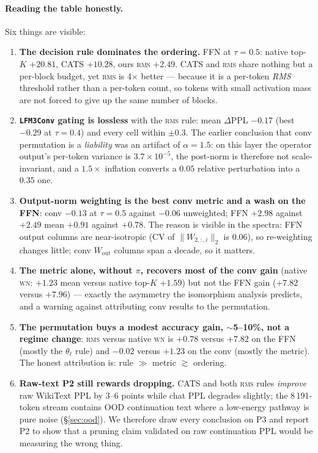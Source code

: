 \documentclass[11pt]{article}
\newcommand{\Wout}{\ensuremath{W_{\mathrm{out}}}}
\newcommand{\thetal}{\theta_\ell}
\newcommand{\code}[1]{\texttt{\small #1}}
\newcommand{\rms}{\textsc{rms}}
\newcommand{\wn}{\textsc{wn}}
\begin{document}
\paragraph{Reading the table honestly.} Six things are visible:
\begin{enumerate}
\item \textbf{The decision rule dominates the ordering.} FFN at $\tau{=}0.5$: native
top-$K$ $+20.81$, CATS $+10.28$, ours \rms{} $+2.49$. CATS and \rms{} share nothing but a
per-block budget, yet \rms{} is 4$\times$ better --- because it is a per-token \emph{RMS}
threshold rather than a per-token count, so tokens with small activation mass are not
forced to give up the same number of blocks.
\item \textbf{\code{LFM3Conv} gating is lossless} with the \rms{} rule: mean
$\Delta$PPL $-0.17$ (best $-0.29$ at $\tau{=}0.4$) and every cell within
$\pm0.3$. The earlier conclusion that conv permutation is a \emph{liability} was an
artifact of $\alpha{=}1.5$: on this layer the operator output's per-token variance is
$3.7\times10^{-5}$, the post-norm is therefore not scale-invariant, and a $1.5\times$
inflation converts a $0.05$ relative perturbation into a $0.35$ one.
\item \textbf{Output-norm weighting is the best conv metric and a wash on the FFN}: conv
$-0.13$ at $\tau{=}0.5$ against $-0.06$ unweighted; FFN $+2.98$ against $+2.49$ mean
$+0.91$ against $+0.78$. The reason is visible in the spectra: FFN output columns are
near-isotropic ($\mathrm{CV}$ of $\|W_{2,:,i}\|_2$ is 0.06), so re-weighting changes
little; conv \Wout{} columns span a decade, so it matters.
\item \textbf{The metric alone, without $\pi$, recovers most of the conv gain}
(native \wn: $+1.23$ mean versus native top-$K$ $+1.59$) but not the FFN gain
($+7.82$ versus $+7.96$) --- exactly the asymmetry the isomorphism analysis predicts, and
a warning against attributing conv results to the permutation.
\item \textbf{The permutation buys a modest accuracy gain, $\sim$5--10\%, not a
regime change}: \rms{} versus native \wn{} is $+0.78$ versus $+7.82$ on the FFN
(mostly the $\thetal$ rule) and $-0.02$ versus $+1.23$ on the conv (mostly the metric).
The honest attribution is: rule $\gg$ metric $\gtrsim$ ordering.
\item \textbf{Raw-text P2 still rewards dropping.} CATS and both \rms{} rules \emph{improve}
raw WikiText PPL by 3--6 points while chat PPL degrades slightly; the 8\,191-token stream
contains OOD continuation text where a low-energy pathway is pure noise
(\S\ref{sec:ood}). We therefore draw every conclusion on P3 and report P2 to show that a
pruning claim validated on raw continuation PPL would be measuring the wrong thing.
\end{enumerate}
\end{document}
